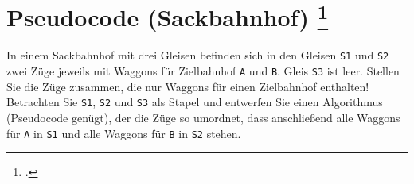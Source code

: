 \documentclass{lehramt-informatik-aufgabe}
\begin{document}

\section{Pseudocode (Sackbahnhof)
\footcite[Seite 3, Aufgabe 4: Stack]{aud:ab:7}}

In einem Sackbahnhof mit drei Gleisen befinden sich in den Gleisen
\texttt{S1} und \texttt{S2} zwei Züge jeweils mit Waggons für
Zielbahnhof \texttt{A} und \texttt{B}. Gleis \texttt{S3} ist leer.
Stellen Sie die Züge zusammen, die nur Waggons für einen Zielbahnhof
enthalten! Betrachten Sie \texttt{S1}, \texttt{S2} und \texttt{S3} als
Stapel und entwerfen Sie einen Algorithmus (Pseudocode genügt), der die
Züge so umordnet, dass anschließend alle Waggons für \texttt{A} in
\texttt{S1} und alle Waggons für \texttt{B} in \texttt{S2} stehen.
\end{document}
